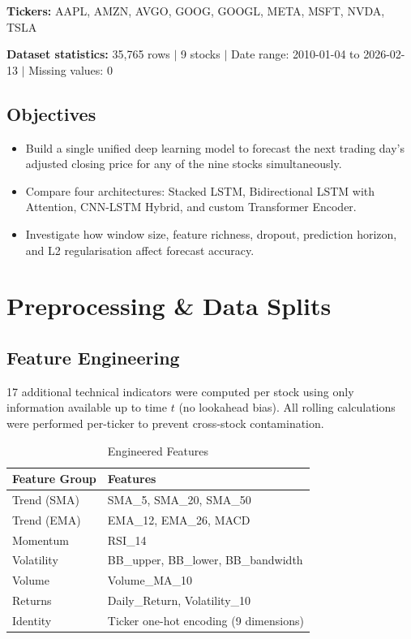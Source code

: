 \documentclass[11pt]{article}
\begin{document}
\noindent\textbf{Tickers:} AAPL, AMZN, AVGO, GOOG, GOOGL, META,
MSFT, NVDA, TSLA

\noindent\textbf{Dataset statistics:} 35,765 rows $|$ 9 stocks $|$
Date range: 2010-01-04 to 2026-02-13 $|$ Missing values: 0

\subsection{Objectives}

\begin{itemize}
  \item Build a single unified deep learning model to forecast the
        next trading day's adjusted closing price for any of the nine
        stocks simultaneously.
  \item Compare four architectures: Stacked LSTM, Bidirectional LSTM
        with Attention, CNN-LSTM Hybrid, and custom Transformer Encoder.
  \item Investigate how window size, feature richness, dropout,
        prediction horizon, and L2 regularisation affect forecast
        accuracy.
\end{itemize}

\section{Preprocessing \& Data Splits}

\subsection{Feature Engineering}

17 additional technical indicators were computed per stock using only
information available up to time $t$ (no lookahead bias). All rolling
calculations were performed per-ticker to prevent cross-stock
contamination.

\begin{table}[h]
\caption{Engineered Features}
\label{tab:features}
\begin{tabularx}{\linewidth}{L{3.2cm} X}
\toprule
\textbf{Feature Group} & \textbf{Features} \\
\midrule
Trend (SMA)   & SMA\_5, SMA\_20, SMA\_50 \\
Trend (EMA)   & EMA\_12, EMA\_26, MACD \\
Momentum      & RSI\_14 \\
Volatility    & BB\_upper, BB\_lower, BB\_bandwidth \\
Volume        & Volume\_MA\_10 \\
Returns       & Daily\_Return, Volatility\_10 \\
Identity      & Ticker one-hot encoding (9 dimensions) \\
\bottomrule
\end{tabularx}
\end{table}
\end{document}

